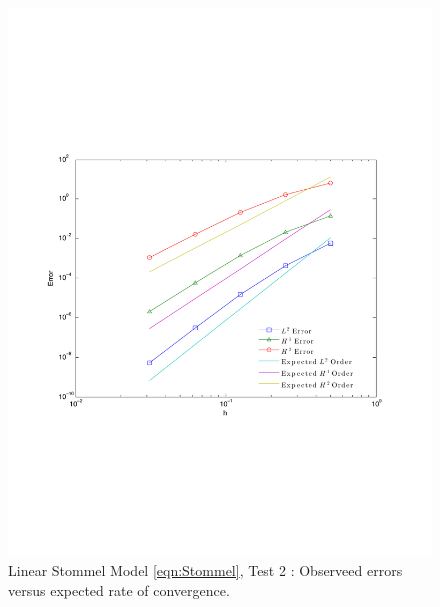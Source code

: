 \begin{figure}
  \begin{center}
    \includegraphics[scale=0.5]{Figures/StommelMyersConvergence.pdf}
    \caption{Linear Stommel Model \eqref{eqn:Stommel}, Test 2 \cite{Myers}:
      Observeed errors versus expected rate of convergence.}
    \label{fig:StommelErrorsMeyers}
  \end{center}
\end{figure}

